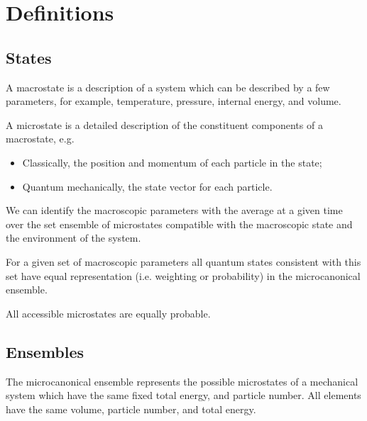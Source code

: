 
\section{Definitions}
\label{sec:definitions}

\subsection{States}
\label{sec:states}

\begin{definition}[Macrostate]
  A macrostate is a description of a system which can be described by
  a few parameters, for example, temperature, pressure, internal
  energy, and volume.
\end{definition}

\begin{definition}[Microstate]
  A microstate is a detailed description of the constituent components of a macrostate, e.g.
  \begin{itemize}
  \item Classically, the position and momentum of each particle in the state;
  \item Quantum mechanically, the state vector for each particle.
  \end{itemize}
\end{definition}

\begin{postulate}
  \label{pos:averageover}
  We can identify the macroscopic parameters with the average at a
  given time over the set ensemble of microstates compatible with the
  macroscopic state and the environment of the system.
\end{postulate}
\begin{postulate}
  \label{pos:equalrep}
  For a given set of macroscopic parameters all quantum states
  consistent with this set have equal representation (i.e. weighting
  or probability) in the microcanonical ensemble.
\end{postulate}
\begin{postulate}
  All accessible microstates are equally probable.
\end{postulate}

\subsection{Ensembles}
\label{sec:ensembles}

\begin{definition}
  The microcanonical ensemble represents the possible microstates of a
  mechanical system which have the same fixed total energy, and
  particle number.  All elements have the same volume, particle
  number, and total energy.
\end{definition}

